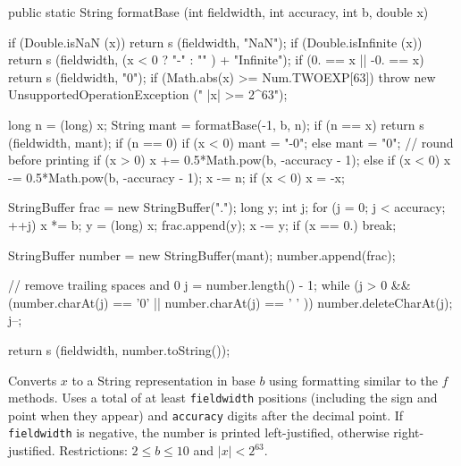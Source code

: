 \begin{code}

   public static String formatBase (int fieldwidth, int accuracy, int b,
                                    double x)\begin{hide} {
      if (Double.isNaN (x))
         return s (fieldwidth, "NaN");
      if (Double.isInfinite (x))
         return s (fieldwidth, (x < 0 ? "-" : "" ) + "Infinite");
      if (0. == x || -0. == x)
         return s (fieldwidth, "0");
      if (Math.abs(x) >= Num.TWOEXP[63])
         throw new UnsupportedOperationException ("   |x| >= 2^63");

      long n = (long) x;
      String mant = formatBase(-1, b, n);
      if (n == x)
         return s (fieldwidth, mant);
      if (n == 0) {
         if (x < 0) {
            mant = "-0";
         } else
            mant = "0";
      }
      // round before printing
      if (x > 0)
         x += 0.5*Math.pow(b, -accuracy - 1);
      else if (x < 0)
         x -= 0.5*Math.pow(b, -accuracy - 1);
       x -= n;
      if (x < 0)
         x = -x;

      StringBuffer frac = new StringBuffer(".");
      long y;
      int j;
      for (j = 0; j < accuracy; ++j) {
         x *= b;
         y = (long) x;
         frac.append(y);
         x -= y;
         if (x == 0.)
            break;
      }

      StringBuffer number = new StringBuffer(mant);
      number.append(frac);

      // remove trailing spaces and 0
      j = number.length() - 1;
      while (j > 0 && (number.charAt(j) == '0' || number.charAt(j) == ' ' )) {
         number.deleteCharAt(j);
         j--;
      }

      return s (fieldwidth, number.toString());
   }\end{hide}
\end{code}
\begin{tabb}
Converts $x$ to a String representation in base $b$ using formatting similar
to the $f$ methods. Uses a total of at least \texttt{fieldwidth} positions
(including the sign and point when they appear) and \texttt{accuracy} digits
 after the decimal point. If \texttt{fieldwidth} is negative, the number is
  printed  left-justified, otherwise right-justified.
  Restrictions: $2 \le  b  \le 10$ and $|x| < 2^{63}$.
\end{tabb}
\begin{htmlonly}
\end{htmlonly}
